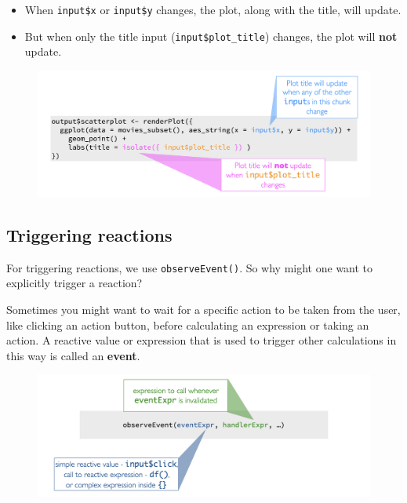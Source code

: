\documentclass[
  letterpaper,
  DIV=11,
  numbers=noendperiod]{scrreprt}
\providecommand{\tightlist}{%
  \setlength{\itemsep}{0pt}\setlength{\parskip}{0pt}}
\begin{document}
\begin{itemize}
\tightlist
\item
  When \texttt{input\$x} or \texttt{input\$y} changes, the plot, along
  with the title, will update.
\item
  But when only the title input (\texttt{input\$plot\_title}) changes,
  the plot will \textbf{not} update.
\end{itemize}

\begin{figure}

{\centering \includegraphics[width=1\textwidth,height=\textheight]{./images/isolate.png}

}

\end{figure}

\hypertarget{triggering-reactions}{%
\subsection{Triggering reactions}\label{triggering-reactions}}

For triggering reactions, we use \texttt{observeEvent()}. So why might
one want to explicitly trigger a reaction?

Sometimes you might want to wait for a specific action to be taken from
the user, like clicking an action button, before calculating an
expression or taking an action. A reactive value or expression that is
used to trigger other calculations in this way is called an
\textbf{event}.

\begin{figure}

{\centering \includegraphics[width=1\textwidth,height=\textheight]{./images/observeEvent.png}

}

\end{figure}
\end{document}
